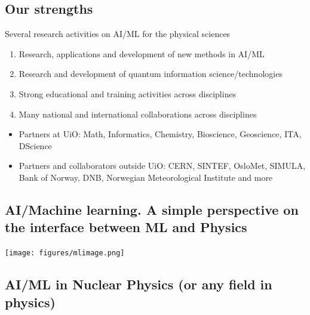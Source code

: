 \documentclass[%
oneside,                 %
final,                   %
10pt]{article}
\begin{document}
\subsection{Our strengths}

\begin{block}{Several research activities on AI/ML for the physical sciences }
\begin{enumerate}
\item Research, applications and development of new methods in AI/ML

\item Research and development of quantum information science/technologies

\item Strong educational and training activities across disciplines

\item Many national and international collaborations across disciplines
\end{enumerate}

\noindent
\end{block}

\begin{itemize}
\item Partners at UiO: Math, Informatics, Chemistry, Bioscience, Geoscience, ITA, DScience

\item Partners and collaborators outside UiO: CERN, SINTEF, OsloMet, SIMULA, Bank of Norway, DNB,  Norwegian Meteorological Institute and more
\end{itemize}

\noindent
\subsection{AI/Machine learning. A simple perspective on the interface between ML and Physics}

\vspace{6mm}

\centerline{\texttt{[image: figures/mlimage.png]}}

\vspace{6mm}

\subsection{AI/ML in Nuclear  Physics (or any field in physics)}

\vspace{6mm}
\end{document}
